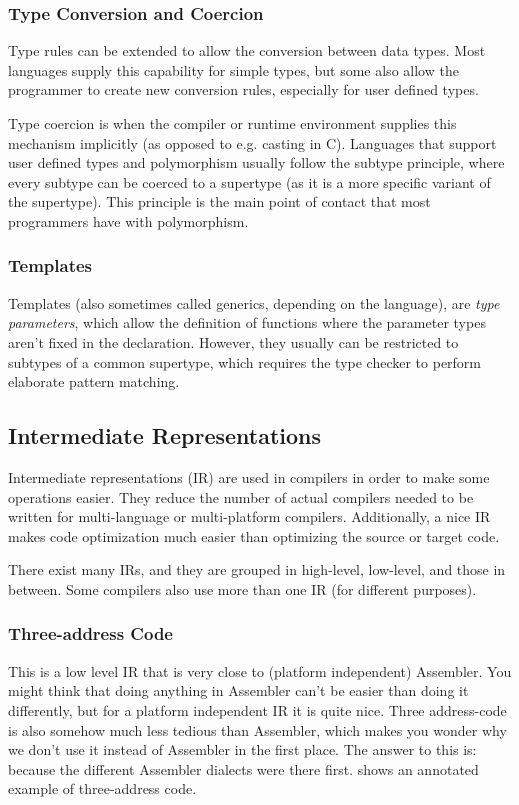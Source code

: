 \documentclass{article}
\begin{document}
\subsubsection{Type Conversion and Coercion}
Type rules can be extended to allow the conversion between data types.
Most languages supply this capability for simple types, but some also allow the programmer to create new conversion rules, especially for user defined types.

Type coercion is when the compiler or runtime environment supplies this mechanism implicitly (as opposed to e.g. casting in C).
Languages that support user defined types and polymorphism usually follow the subtype principle, where every subtype can be coerced to a supertype (as it is a more specific variant of the supertype).
This principle is the main point of contact that most programmers have with polymorphism.

\subsubsection{Templates}
Templates (also sometimes called generics, depending on the language), are \emph{type parameters}, which allow the definition of functions where the parameter types aren't fixed in the declaration.
However, they usually can be restricted to subtypes of a common supertype, which requires the type checker to perform elaborate pattern matching.

\subsection{Intermediate Representations}
Intermediate representations (IR) are used in compilers in order to make some operations easier.
They reduce the number of actual compilers needed to be written for multi-language or multi-platform compilers.
Additionally, a nice IR makes code optimization much easier than optimizing the source or target code.

There exist many IRs, and they are grouped in high-level, low-level, and those in between.
Some compilers also use more than one IR (for different purposes).

\subsubsection{Three-address Code}
This is a low level IR that is very close to (platform independent) Assembler.
You might think that doing anything in Assembler can't be easier than doing it differently, but for a platform independent IR it is quite nice.
Three address-code is also somehow much less tedious than Assembler, which makes you wonder why we don't use it instead of Assembler in the first place.
The answer to this is: because the different Assembler dialects were there first.
 shows an annotated example of three-address code.
\end{document}

